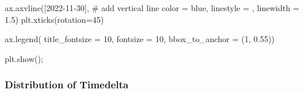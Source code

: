 \documentclass[
  letterpaper,
  DIV=11,
  numbers=noendperiod]{scrartcl}
\newenvironment{Shaded}{\begin{snugshade}}{\end{snugshade}}
\newcommand{\CommentTok}[1]{\textcolor[rgb]{0.37,0.37,0.37}{#1}}
\newcommand{\DecValTok}[1]{\textcolor[rgb]{0.68,0.00,0.00}{#1}}
\newcommand{\FloatTok}[1]{\textcolor[rgb]{0.68,0.00,0.00}{#1}}
\newcommand{\NormalTok}[1]{\textcolor[rgb]{0.00,0.23,0.31}{#1}}
\newcommand{\OperatorTok}[1]{\textcolor[rgb]{0.37,0.37,0.37}{#1}}
\newcommand{\StringTok}[1]{\textcolor[rgb]{0.13,0.47,0.30}{#1}}
\begin{document}
\begin{Shaded}
\begin{Highlighting}[]
\NormalTok{ax.axvline([}\StringTok{\textquotesingle{}2022{-}11{-}30\textquotesingle{}}\NormalTok{], }\CommentTok{\# add vertical line}
\NormalTok{           color }\OperatorTok{=} \StringTok{\textquotesingle{}blue\textquotesingle{}}\NormalTok{,}
\NormalTok{           linestyle }\OperatorTok{=} \StringTok{\textquotesingle{}{-}{-}\textquotesingle{}}\NormalTok{,}
\NormalTok{           linewidth }\OperatorTok{=} \FloatTok{1.5}\NormalTok{)}
\NormalTok{plt.xticks(rotation}\OperatorTok{=}\DecValTok{45}\NormalTok{)}



\NormalTok{ax.legend( title\_fontsize }\OperatorTok{=} \DecValTok{10}\NormalTok{, fontsize }\OperatorTok{=} \DecValTok{10}\NormalTok{,}
\NormalTok{          bbox\_to\_anchor }\OperatorTok{=}\NormalTok{ (}\DecValTok{1}\NormalTok{, }\FloatTok{0.55}\NormalTok{))}

\NormalTok{plt.show()}\OperatorTok{;}
\end{Highlighting}
\end{Shaded}

\subsubsection{Distribution of
Timedelta}\label{distribution-of-timedelta}
\end{document}
